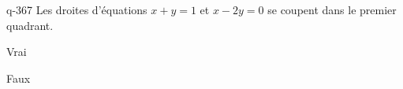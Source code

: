 \begin{truefalse}{q-367}
Les droites d'équations $x+y=1$ et $x-2y=0$ se coupent dans le premier quadrant.
\item* Vrai
\item Faux
\end{truefalse}

